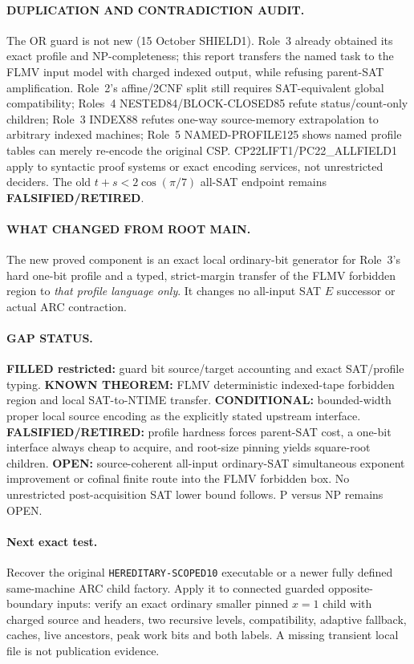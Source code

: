 \documentclass[11pt]{article}
\begin{document}
\paragraph{DUPLICATION AND CONTRADICTION AUDIT.} The OR guard is not new (15 October SHIELD1). Role~3 already obtained its exact profile and NP-completeness; this report transfers the named task to the FLMV input model with charged indexed output, while refusing parent-SAT amplification. Role~2's affine/2CNF split still requires SAT-equivalent global compatibility; Roles~4 NESTED84/BLOCK-CLOSED85 refute status/count-only children; Role~3 INDEX88 refutes one-way source-memory extrapolation to arbitrary indexed machines; Role~5 NAMED-PROFILE125 shows named profile tables can merely re-encode the original CSP. CP22LIFT1/PC22_ALLFIELD1 apply to syntactic proof systems or exact encoding services, not unrestricted deciders. The old $t+s<2\cos(\pi/7)$ all-SAT endpoint remains \textbf{FALSIFIED/RETIRED}.

\paragraph{WHAT CHANGED FROM ROOT MAIN.} The new proved component is an exact local ordinary-bit generator for Role~3's hard one-bit profile and a typed, strict-margin transfer of the FLMV forbidden region to \emph{that profile language only}. It changes no all-input SAT $E$ successor or actual ARC contraction.

\paragraph{GAP STATUS.} \textbf{FILLED restricted:} guard bit source/target accounting and exact SAT/profile typing. \textbf{KNOWN THEOREM:} FLMV deterministic indexed-tape forbidden region and local SAT-to-NTIME transfer. \textbf{CONDITIONAL:} bounded-width proper local source encoding as the explicitly stated upstream interface. \textbf{FALSIFIED/RETIRED:} profile hardness forces parent-SAT cost, a one-bit interface always cheap to acquire, and root-size pinning yields square-root children. \textbf{OPEN:} source-coherent all-input ordinary-SAT simultaneous exponent improvement or cofinal finite route into the FLMV forbidden box. No unrestricted post-acquisition SAT lower bound follows. P versus NP remains OPEN.

\paragraph{Next exact test.} Recover the original \texttt{HEREDITARY-SCOPED10} executable or a newer fully defined same-machine ARC child factory. Apply it to connected guarded opposite-boundary inputs: verify an exact ordinary smaller pinned $x=1$ child with charged source and headers, two recursive levels, compatibility, adaptive fallback, caches, live ancestors, peak work bits and both labels. A missing transient local file is not publication evidence.
\end{document}
